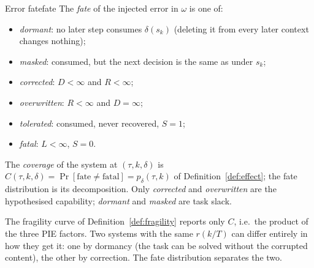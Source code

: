 \documentclass[10pt,a4paper]{article}
\begin{document}
\begin{definition}{Error fate}{fate}
The \emph{fate} of the injected error in $\omega$ is one of:
\begin{itemize}[leftmargin=1.1em]
\item \emph{dormant}: no later step consumes $\delta(s_k)$ (deleting it from every later context changes nothing);
\item \emph{masked}: consumed, but the next decision is the same as under $s_k$;
\item \emph{corrected}: $D<\infty$ and $R<\infty$;
\item \emph{overwritten}: $R<\infty$ and $D=\infty$;
\item \emph{tolerated}: consumed, never recovered, $S{=}1$;
\item \emph{fatal}: $L<\infty$, $S{=}0$.
\end{itemize}
The \emph{coverage} of the system at $(\tau,k,\delta)$ is $C(\tau,k,\delta)=\Pr[\text{fate}\neq\text{fatal}]=p_\delta(\tau,k)$ of Definition~\ref{def:effect}; the fate distribution is its decomposition. Only \emph{corrected} and \emph{overwritten} are the hypothesised capability; \emph{dormant} and \emph{masked} are task slack.
\end{definition}

The fragility curve of Definition~\ref{def:fragility} reports only $C$, i.e.\ the product of the three PIE factors. Two systems with the same $r(k/T)$ can differ entirely in how they get it: one by dormancy (the task can be solved without the corrupted content), the other by correction. The fate distribution separates the two.
\end{document}
